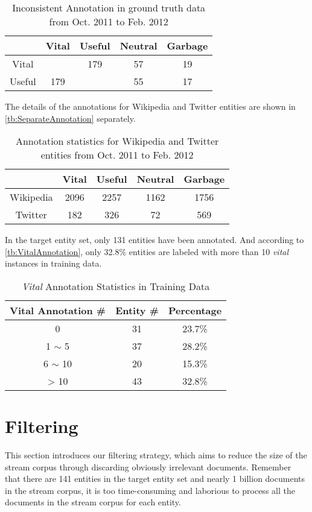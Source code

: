 \documentclass{sig-alternate}
\begin{document}
\begin{table}[thbp]
\centering
\caption{Inconsistent Annotation in ground truth data from Oct. 2011 to Feb. 2012}\label{tb:InconsistentAnnotation}
\begin{tabular}{ccccc}\hline
&Vital & Useful & Neutral & Garbage\\ \hline
Vital &  \backslashbox{}{} & 179 & 57 & 19 \\  \hline
Useful & 179 & \backslashbox{}{} & 55 & 17 \\ \hline
\end{tabular}
\end{table}

The details of the annotations for Wikipedia and Twitter entities are shown in \autoref{tb:SeparateAnnotation} separately.
\begin{table}[thbp]
\centering
\caption{Annotation statistics for Wikipedia and Twitter entities from Oct. 2011 to Feb. 2012}\label{tb:SeparateAnnotation}
\begin{tabular}{ccccc} \hline
 & Vital & Useful & Neutral & Garbage \\ \hline
Wikipedia & 2096 & 2257	& 1162 & 1756 \\ \hline
Twitter & 182 &	326	& 72 & 569 \\ \hline
\end{tabular}
\end{table}
In the target entity set,  only 131 entities have been annotated. And according to \autoref{tb:VitalAnnotation}, only 32.8\% entities are labeled with more than 10 \textit{vital} instances in training data.
\begin{table}[thbp]
\centering
\caption{\textit{Vital} Annotation Statistics in Training Data}\label{tb:VitalAnnotation}
\begin{tabular}{ccc} \hline
Vital Annotation \# & Entity \#  & Percentage\\ \hline
0 & 31 & 23.7\% \\ \hline
1 $\sim$ 5 & 37 & 28.2\% \\ \hline
6 $\sim$ 10 & 20 & 15.3\% \\ \hline
> 10 & 43 & 32.8\%\\ \hline
\end{tabular}
\end{table}

\section{Filtering}\label{sec:filtering}
This section introduces our filtering strategy, which aims to reduce the size of the stream corpus through discarding obviously irrelevant documents. Remember that there are 141 entities in the target entity set and nearly 1 billion documents in the stream corpus, it is too time-consuming and laborious to process all the documents in the stream corpus for each entity.
\end{document}
